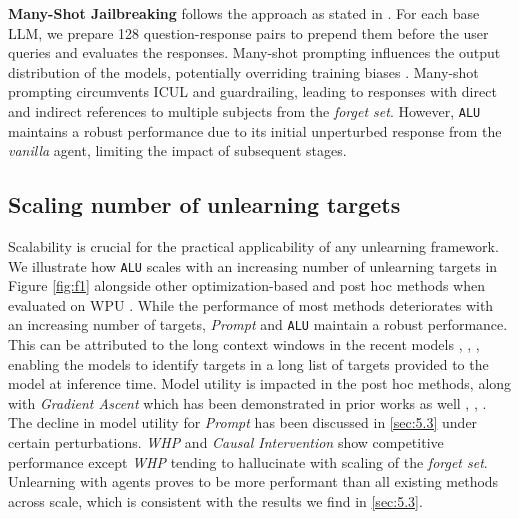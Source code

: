  \textbf{Many-Shot Jailbreaking} follows the approach as stated in \cite{anil2024many}. For each base LLM, we prepare 128 question-response pairs to prepend them before the user queries and evaluates the responses. Many-shot prompting influences the output distribution of the models, potentially overriding training biases \cite{agarwal2024manyshotincontextlearning}. Many-shot prompting circumvents ICUL and guardrailing, leading to responses with direct and indirect references to multiple subjects from the \textit{forget set}. However, \texttt{ALU} maintains a robust performance due to its initial unperturbed response from the \textit{vanilla} agent, limiting the impact of subsequent stages.

\subsection{Scaling number of unlearning targets}
\label{sec:5.4}
Scalability is crucial for the practical applicability of any unlearning framework. We illustrate how \texttt{ALU} scales with an increasing number of unlearning targets in Figure \ref{fig:f1} alongside other optimization-based and post hoc methods when evaluated on WPU \cite{liu2024revisitingwhosharrypotter}. While the performance of most methods deteriorates with an increasing number of targets, \textit{Prompt} and \texttt{ALU} maintain a robust performance. This can be attributed to the long context windows in the recent models \cite{geminiteam2024gemini15unlockingmultimodal}, \cite{grattafiori2024llama3herdmodels}, \cite{qwen2.5}, enabling the models to identify targets in a long list of targets provided to the model at inference time. Model utility is impacted in the post hoc methods, along with \emph{Gradient Ascent} which has been demonstrated in prior works as well \cite{liu2024largelanguagemodelunlearning}, \cite{liu2024revisitingwhosharrypotter}, \cite{sinha2024unstarunlearningselftaughtantisample}. The decline in model utility for \emph{Prompt} has been discussed in \ref{sec:5.3} under certain perturbations. \emph{WHP} \cite{eldan2023whosharrypotterapproximate} and \emph{Causal Intervention} \cite{liu2024revisitingwhosharrypotter} show competitive performance except \emph{WHP} tending to hallucinate with scaling of the \emph{forget set}. Unlearning with agents proves to be more performant than all existing methods across scale, which is consistent with the results we find in \ref{sec:5.3}.

